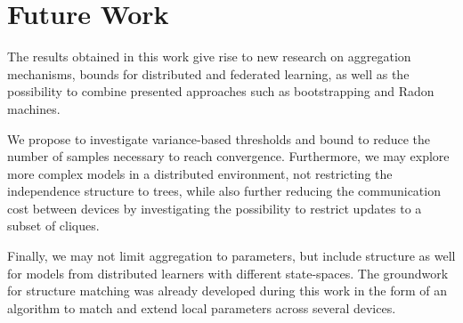 \section{Future Work}
The results obtained in this work give rise to new research on aggregation mechanisms, bounds for distributed and federated learning, as well as the possibility to combine presented approaches such as bootstrapping and Radon machines.

We propose to investigate variance-based thresholds and bound to reduce the number of samples necessary to reach convergence.
Furthermore, we may explore more complex models in a distributed environment, not restricting the independence structure to trees, while also further reducing the communication cost between devices by investigating the possibility to restrict updates to a subset of cliques.

Finally, we may not limit aggregation to parameters, but include structure as well for models from distributed learners with different state-spaces. 
The groundwork for structure matching was already developed during this work in the form of an algorithm to match and extend local parameters across several devices.


